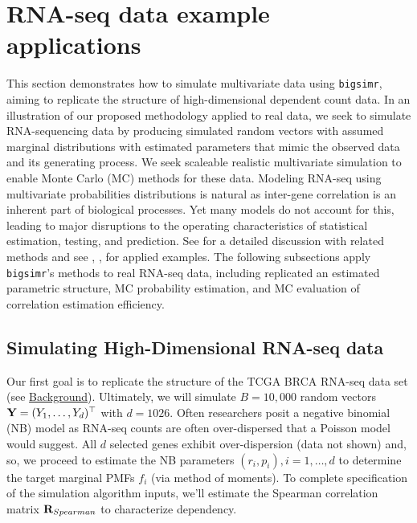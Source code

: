 \documentclass[]{article}
\begin{document}
\hypertarget{examples}{%
\section{RNA-seq data example applications}\label{examples}}

This section demonstrates how to simulate multivariate data using \texttt{bigsimr}, aiming to replicate the structure of high-dimensional dependent count data.
In an illustration of our proposed methodology applied to real data, we seek to simulate RNA-sequencing data by producing simulated random vectors with assumed marginal distributions with estimated parameters that mimic the observed data and its generating process.
We seek scaleable realistic multivariate simulation to enable Monte Carlo (MC) methods for these data.
Modeling RNA-seq using multivariate probabilities distributions is natural as inter-gene correlation is an inherent part of biological processes.
Yet many models do not account for this, leading to major disruptions to the operating characteristics of statistical estimation, testing, and prediction.
See \citet{Efron2012} for a detailed discussion with related methods and see \citet{Wu2012b}, \citet{Schissler2018}, \citet{Schissler2019} for applied examples.
The following subsections apply \texttt{bigsimr}'s methods to real RNA-seq data, including replicated an estimated parametric structure, MC probability estimation, and MC evaluation of correlation estimation efficiency.

\hypertarget{simulating-high-dimensional-rna-seq-data}{%
\subsection{Simulating High-Dimensional RNA-seq data}\label{simulating-high-dimensional-rna-seq-data}}

Our first goal is to replicate the structure of the TCGA BRCA RNA-seq data set (see \href{background}{Background}).
Ultimately, we will simulate \(B=10,000\) random vectors \({\bf Y}=(Y_1, \ldots, Y_d)^\top\) with \(d=1026\).
Often researchers posit a negative binomial (NB) model as RNA-seq counts are often over-dispersed that a Poisson model would suggest.
All \(d\) selected genes exhibit over-dispersion (data not shown) and, so, we proceed to estimate the NB parameters \((r_i, p_i), i=1,\ldots,d\) to determine the target marginal PMFs \(f_i\) (via method of moments).
To complete specification of the simulation algorithm inputs, we'll estimate the Spearman correlation matrix \({ \bf R}_{Spearman}\) to characterize dependency.
\end{document}
